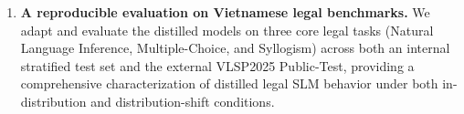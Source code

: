 \begin{enumerate}
    \item \textbf{A reproducible evaluation on Vietnamese legal benchmarks.} We adapt and evaluate the distilled models on three core legal tasks (Natural Language Inference, Multiple-Choice, and Syllogism) across both an internal stratified test set and the external VLSP2025 Public-Test, providing a comprehensive characterization of distilled legal SLM behavior under both in-distribution and distribution-shift conditions.
\end{enumerate}
